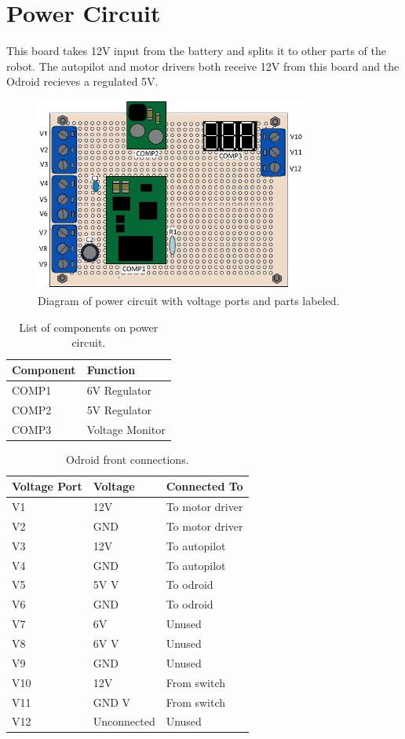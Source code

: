 \documentclass[letterpaper,12pt]{report}
\begin{document}
\section{Power Circuit}
This board takes 12V input from the battery and splits it to other parts of the robot. The autopilot and motor drivers both receive 12V from this board and the Odroid recieves a regulated 5V.
\begin{figure}[h]
	\centering
	\includegraphics[width=0.8\textwidth]{powercircuit2.jpg}
	\caption{Diagram of power circuit with voltage ports and parts labeled.}
	\label{Figure 1:}
\end{figure}
\begin{table}[h]
	\centering
	\begin{tabular}{| l | l |}
 		\hline
 		Component & Function \\ \hline 
 		COMP1 & 6V Regulator \\ \hline
 		COMP2 & 5V Regulator  \\ \hline
 		COMP3 & Voltage Monitor  \\ \hline
	\end{tabular}
	\caption{List of components on power circuit.}
\end{table}
\begin{table}[h]
	\centering
	\begin{tabular}{| l | l | l |}
 		\hline
 		Voltage Port & Voltage & Connected To \\ \hline 
 		V1 & 12V & To motor driver \\ \hline
 		V2 & GND & To motor driver \\ \hline
 		V3 & 12V & To autopilot \\ \hline
 		V4 & GND & To autopilot \\ \hline
 		V5 & 5V V & To odroid \\ \hline
 		V6 & GND & To odroid \\ \hline
 		V7 & 6V & Unused \\ \hline
 		V8 & 6V V & Unused \\ \hline
 		V9 & GND & Unused\\ \hline
 		V10 & 12V & From switch \\ \hline
 		V11 & GND V & From switch \\ \hline
 		V12 & Unconnected & Unused \\ \hline
	\end{tabular}
	\caption{Odroid front connections.}
\end{table}
\end{document}
